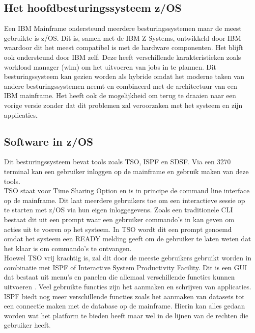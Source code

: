\subsection{Het hoofdbesturingssysteem z/OS}
Een IBM Mainframe ondersteund meerdere besturingssystemen maar de meest gebruikte is z/OS. Dit is, samen met de IBM Z Systems, ontwikkeld door IBM waardoor dit het meest compatibel is met de hardware componenten. Het blijft ook ondersteund door IBM zelf. Deze heeft verschillende karakteristieken zoals workload manager (wlm) om het uitvoeren van jobs in te plannen. Dit besturingssysteem kan gezien worden als hybride omdat het moderne taken van andere besturingssystemen neemt en combineerd met de architectuur van een IBM mainframe. Het heeft ook de mogelijkheid om terug te draaien naar een vorige versie zonder dat dit problemen zal veroorzaken met het systeem en zijn applicaties. \autocite{Rupp2022} 

\subsection{Software in z/OS}
Dit besturingssysteem bevat tools zoals TSO, ISPF en SDSF. Via een 3270 terminal kan een gebruiker inloggen op de mainframe en gebruik maken van deze tools. \\

TSO staat voor Time Sharing Option en is in principe de command line interface op de mainframe. Dit laat meerdere gebruikers toe om een interactieve sessie op te starten met z/OS via hun eigen inloggegevens. Zoals een traditionele CLI bestaat dit uit een prompt waar een gebruiker commando's in kan geven om acties uit te voeren op het systeem. In TSO wordt dit een  prompt genoemd omdat het systeem een READY melding geeft om de gebruiker te laten weten dat het klaar is om commando's te ontvangen. \autocite{IBM} \\

Hoewel TSO vrij krachtig is, zal dit door de meeste gebruikers gebruikt worden in combinatie met ISPF of Interactive System Productivity Facility. Dit is een GUI dat bestaat uit menu's en panelen die allemaal verschillende functies kunnen uitvoeren \autocite{IBM}. Veel gebruikte functies zijn het aanmaken en schrijven van applicaties. ISPF biedt nog meer verschillende functies zoals het aanmaken van datasets tot een connectie maken met de database op de mainframe. Hierin kan alles gedaan worden wat het platform te bieden heeft maar wel in de lijnen van de rechten die gebruiker heeft. \autocite{IBM} \\

